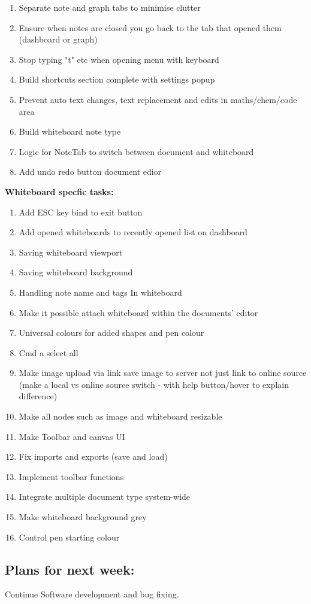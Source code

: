 \begin{enumerate}
    \item Separate note and graph tabs to minimise clutter 
    \item Ensure when notes are closed you go back to the tab that opened them (dashboard or graph) 
    \item Stop typing "t" etc when opening menu with keyboard 
    \item Build shortcuts section complete with settings popup 
    \item Prevent auto text changes, text replacement and edits in maths/chem/code area 
    \item Build whiteboard note type 
    \item Logic for NoteTab to switch between document and whiteboard 
    \item Add undo redo button document edior 
\end{enumerate}

\textbf{Whiteboard specfic tasks:}

\begin{enumerate}
    \item Add ESC key bind to exit button 
    \item Add opened whiteboards to recently opened list on dashboard 
    \item Saving whiteboard viewport 
    \item Saving whiteboard background 
    \item Handling note name and tags In whiteboard 
    \item Make it possible attach whiteboard within the documents' editor 
    \item Universal colours for added shapes and pen colour 
    \item Cmd a select all 
    \item Make image upload via link save image to server not just link to online source (make a local vs online source switch - with help button/hover to explain difference) 
    \item Make all nodes such as image and whiteboard resizable 
    \item Make Toolbar and canvas UI 
    \item Fix imports and exports (save and load) 
    \item Implement toolbar functions  
    \item Integrate multiple document type system-wide 
    \item Make whiteboard background grey 
    \item Control pen starting colour 
\end{enumerate}

\subsection*{Plans for next week:}
Continue Software development and bug fixing.
